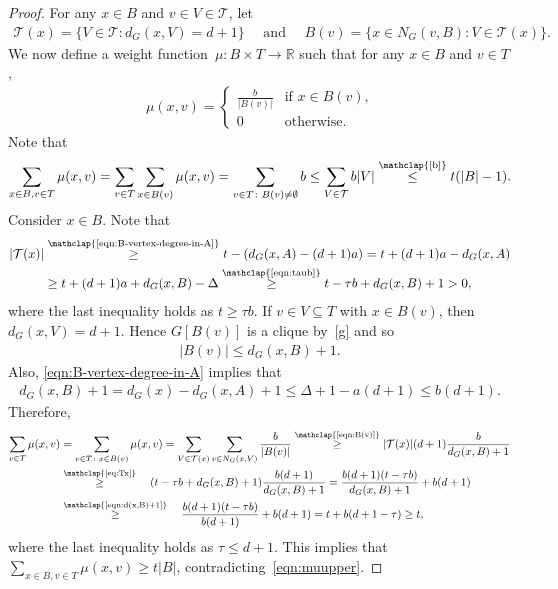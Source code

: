 \documentclass[11pt]{article}
\theoremstyle{plain}
\numberwithin{equation}{section}
\begin{document}
\begin{proof}
	
For any $x \in B$ and $v\in V\in \mathcal{T}$, let
	\begin{align*}
		\mathcal{T}(x) =\{V\in \mathcal{T}\colon d_G(x, V)=d+1\}\quad \text{ and }\quad
		B(v) = \{x\in  N_G(v,B)\colon V\in  \mathcal{T}(x)\}.
	\end{align*}
We now define a weight function~$\mu : B \times T  \rightarrow \mathbb{R}$ such that  for any $x\in B$  and $v\in T$,
\begin{align*}
	\mu(x,v)=  \begin{cases}
			\frac{b}{|B(v)|} & \text{if $x \in B(v)$,}\\
			0 & \text{otherwise.}
	\end{cases}
\end{align*}
Note that
\begin{align}
\sum_{x \in B, v\in T} \mu(x,v) = \sum_{v \in T} \sum_{x \in B(v)} \mu(x,v)
= \sum_{v \in T \colon B(v) \ne \emptyset} b
\le \sum_{V \in \mathcal{T}} b |V|
\overset{\mathclap{\text{\ref{b}}}}\le t( |B|-1). \label{eqn:muupper}
\end{align}
Consider $x \in B$.	Note that
	\begin{align}
		|\mathcal{T}(x)|
		& \overset{\mathclap{\text{\eqref{eqn:B-vertex-degree-in-A}}}}{\ge}t-(d_{G}(x,A)-(d+1)a)=   t+(d+1)a  - d_{G}(x,A)\nonumber\\
	&	\ge t+(d+1)a  + d_G(x,B) - \Delta
  \overset{\mathclap{\text{\eqref{eqn:taub}}}}{\geq} t-\tau b+d_{G}(x,B)+1 >0, \label{eq:Tx}
	\end{align}
		where the last inequality holds as $ t \ge \tau b$.
If $v \in V \subseteq T$ with $x \in B(v)$, then $d_G(x,V) = d+1$.
Hence $G[B(v)]$ is a clique by~\ref{g} and  so
	\begin{align}
		|B(v)| \leq d_{G}(x,B)+1.
		\label{eqn:B(v)}
	\end{align}
	Also, \eqref{eqn:B-vertex-degree-in-A} implies that
	\begin{align}
		 d_{G}(x,B)+1  = d_{G}(x) - d_{G}(x,A)+1 \le \Delta+1 - a(d+1) \le b(d+1).
		\label{eqn:d(x,B)+1}
	\end{align}
Therefore,
\begin{align*}
	\sum_{v \in T }\mu(x,v) & =
    \sum_{v \in T \colon x \in B(v)}\mu(x,v) = \sum_{ V \in \mathcal{T}(x)} \sum_{v\in N_G(x,V)} \frac{b}{|B(v)|}
		\overset{\mathclap{\text{\eqref{eqn:B(v)}}}}{\geq}  |\mathcal{T}(x)| (d+1) \frac{b}{d_{G}(x,B)+1} \\
		&\overset{\mathclap{\text{\eqref{eq:Tx}}}}{\geq}\quad (t-\tau b+d_{G}(x,B)+1)  \frac{b(d+1)}{d_{G}(x,B)+1}
	 = \frac{b(d+1)(t-\tau b)}{d_{G}(x,B)+1}+b(d+1) \\
	&\overset{\mathclap{\text{\eqref{eqn:d(x,B)+1}}}}{\geq}\quad\frac{b(d+1)(t-\tau b)}{b(d+1)}+b(d+1)
	=  t+b(d+1 - \tau) \ge t,
\end{align*}
where the last inequality holds as $\tau \le d+1$.
This implies that $\sum_{x \in B, v\in T} \mu(x,v) \ge t|B|$, contradicting~\eqref{eqn:muupper}.
	\end{proof}
\end{document}
